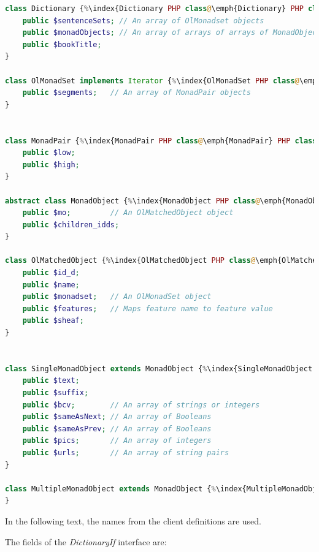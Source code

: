 \documentclass[11pt,oneside,a4paper]{memoir}
\begin{document}
\begin{lstlisting}[language=PHP]
class Dictionary {%\index{Dictionary PHP class@\emph{Dictionary} PHP class}%
    public $sentenceSets; // An array of OlMonadset objects
    public $monadObjects; // An array of arrays of arrays of MonadObject objects
    public $bookTitle;
}

class OlMonadSet implements Iterator {%\index{OlMonadSet PHP class@\emph{OlMonadSet} PHP class}%
    public $segments;   // An array of MonadPair objects
}


class MonadPair {%\index{MonadPair PHP class@\emph{MonadPair} PHP class}%
    public $low;
    public $high;
}

abstract class MonadObject {%\index{MonadObject PHP class@\emph{MonadObject} PHP class}%
    public $mo;         // An OlMatchedObject object
    public $children_idds;
}

class OlMatchedObject {%\index{OlMatchedObject PHP class@\emph{OlMatchedObject} PHP class}%
    public $id_d;
    public $name;
    public $monadset;   // An OlMonadSet object
    public $features;   // Maps feature name to feature value
    public $sheaf;
}


class SingleMonadObject extends MonadObject {%\index{SingleMonadObject PHP class@\emph{SingleMonadObject} PHP class}%
    public $text;
    public $suffix;
    public $bcv;        // An array of strings or integers
    public $sameAsNext; // An array of Booleans
    public $sameAsPrev; // An array of Booleans
    public $pics;       // An array of integers
    public $urls;       // An array of string pairs
}

class MultipleMonadObject extends MonadObject {%\index{MultipleMonadObject PHP class@\emph{MultipleMonadObject} PHP class}%
}
\end{lstlisting}

In the following text, the names from the client definitions are used.

The fields of the \emph{DictionaryIf} interface are:
\end{document}
